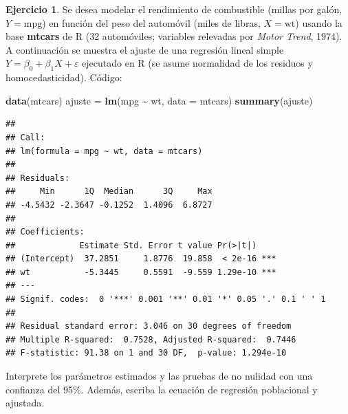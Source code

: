\documentclass[
  11pt,
]{book}
\newenvironment{Shaded}{\begin{snugshade}}{\end{snugshade}}
\newcommand{\AttributeTok}[1]{\textcolor[rgb]{0.13,0.29,0.53}{#1}}
\newcommand{\FunctionTok}[1]{\textcolor[rgb]{0.13,0.29,0.53}{\textbf{#1}}}
\newcommand{\NormalTok}[1]{#1}
\newcommand{\OtherTok}[1]{\textcolor[rgb]{0.56,0.35,0.01}{#1}}
\newcommand{\SpecialCharTok}[1]{\textcolor[rgb]{0.81,0.36,0.00}{\textbf{#1}}}
\theoremstyle{definition}
\theoremstyle{definition}
\theoremstyle{definition}
\newtheorem{exercise}{Ejercicio}[chapter]
\theoremstyle{definition}
\theoremstyle{remark}
\begin{document}
\begin{exercise}
Se desea modelar el rendimiento de combustible (millas por galón, \(Y=\text{mpg}\)) en función del peso del automóvil (miles de libras, \(X=\text{wt}\)) usando la base \textbf{mtcars} de R (32 automóviles; variables relevadas por \emph{Motor Trend}, 1974). A continuación se muestra el ajuste de una regresión lineal simple \(Y=\beta_0+\beta_1 X+\varepsilon\) ejecutado en R (se asume normalidad de los residuos y homocedasticidad). Código:

\begin{Shaded}
\begin{Highlighting}[]
\FunctionTok{data}\NormalTok{(mtcars)}
\NormalTok{ajuste }\OtherTok{=} \FunctionTok{lm}\NormalTok{(mpg }\SpecialCharTok{\textasciitilde{}}\NormalTok{ wt, }\AttributeTok{data =}\NormalTok{ mtcars)}
\FunctionTok{summary}\NormalTok{(ajuste)}
\end{Highlighting}
\end{Shaded}

\begin{verbatim}
## 
## Call:
## lm(formula = mpg ~ wt, data = mtcars)
## 
## Residuals:
##     Min      1Q  Median      3Q     Max 
## -4.5432 -2.3647 -0.1252  1.4096  6.8727 
## 
## Coefficients:
##             Estimate Std. Error t value Pr(>|t|)    
## (Intercept)  37.2851     1.8776  19.858  < 2e-16 ***
## wt           -5.3445     0.5591  -9.559 1.29e-10 ***
## ---
## Signif. codes:  0 '***' 0.001 '**' 0.01 '*' 0.05 '.' 0.1 ' ' 1
## 
## Residual standard error: 3.046 on 30 degrees of freedom
## Multiple R-squared:  0.7528, Adjusted R-squared:  0.7446 
## F-statistic: 91.38 on 1 and 30 DF,  p-value: 1.294e-10
\end{verbatim}

Interprete los parámetros estimados y las pruebas de no nulidad con una confianza del 95\%. Además, escriba la ecuación de regresión poblacional y ajustada.
\end{exercise}
\end{document}
